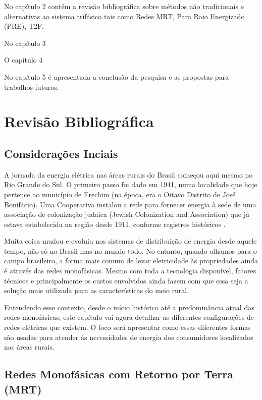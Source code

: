 \documentclass[oneside,openright,12pt]{ufsm_2021} %
\begin{document}
\par No capítulo 2 contém a revisão bibliográfica sobre métodos não tradicionais e alternativas ao sistema trifásico tais como Redes MRT, Para Raio Energizado (PRE), T2F.
\par No capítulo 3 
\par O capítulo 4
\par No capítulo 5 é apresentada a conclusão da pesquisa e as propostas para trabalhos futuros.

\chapter{Revisão Bibliográfica}

\section{Considerações Inciais}

\par A jornada da energia elétrica nas áreas rurais do Brasil começou aqui mesmo no Rio Grande do Sul. O primeiro passo foi dado em 1941, numa localidade que hoje pertence ao município de Erechim (na época, era o Oitavo Distrito de José Bonifácio). Uma Cooperativa instalou a rede para fornecer energia à sede de uma associação de colonização judaica (Jewish Colonization and Association) que já estava estabelecida na região desde 1911, conforme registros históricos \cite{fecoergs_historia_2016}.

\par Muita coisa mudou e evoluiu nos sistemas de distribuição de energia desde aquele tempo, não só no Brasil mas no mundo todo. No entanto, quando olhamos para o campo brasileiro, a forma mais comum de levar eletricidade às propriedades ainda é através das redes monofásicas. Mesmo com toda a tecnologia disponível, fatores técnicos e principalmente os custos envolvidos ainda fazem com que essa seja a solução mais utilizada para as características do meio rural.

\par Entendendo esse contexto, desde o início histórico até a predominância atual das redes monofásicas, este capítulo vai agora detalhar as diferentes configurações de redes elétricas que existem. O foco será apresentar como essas diferentes formas são usadas para atender às necessidades de energia dos consumidores localizados nas áreas rurais.

\section{Redes Monofásicas com Retorno por Terra (MRT)}
\end{document}
